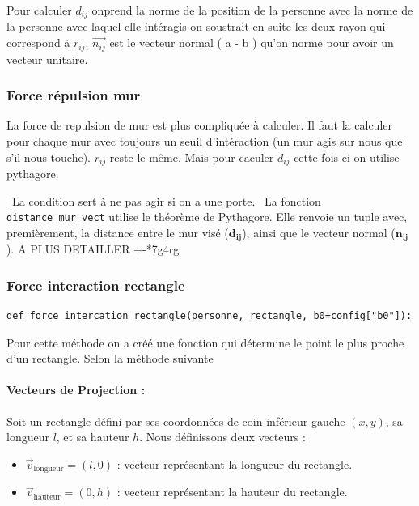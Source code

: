 \documentclass[a4paper,12pt]{article}
\begin{document}
Pour calculer $d_{ij}$ onprend la norme de la position de la personne avec la norme de la personne avec laquel elle intéragis on soustrait en suite les deux rayon qui correspond à $r_{ij}$. $\vec{n_{ij}}$ est le vecteur normal ( a - b ) qu'on norme pour avoir un vecteur unitaire. 


\subsubsection{Force répulsion mur}
La force de repulsion de mur est plus compliquée à calculer. Il faut la calculer pour chaque mur avec toujours un seuil d'intéraction (un mur agis sur nous que s'il nous touche). \textbf{$r_{ij}$} reste le même. Mais pour caculer \textbf{$d_{ij}$} cette fois ci on utilise pythagore.

\
La condition sert à ne pas agir si on a une porte.
\
La fonction \texttt{distance\_mur\_vect} utilise le théorème de Pythagore. Elle renvoie un tuple avec, premièrement, la distance entre le mur visé ($\mathbf{d_{ij}}$), ainsi que le vecteur normal ($\mathbf{n_{ij}}$). A PLUS DETAILLER +-*7g4rg


\subsubsection{Force interaction rectangle}

\begin{verbatim}
def force_intercation_rectangle(personne, rectangle, b0=config["b0"]):
\end{verbatim}

Pour cette méthode on a créé une fonction qui détermine le point le plus proche d'un rectangle. Selon la méthode suivante


\paragraph{Vecteurs de Projection :}

Soit un rectangle défini par ses coordonnées de coin inférieur gauche $(x, y)$, sa longueur $l$, et sa hauteur $h$. Nous définissons deux vecteurs :
\begin{itemize}
    \item $\vec{v}_{\text{longueur}} = (l, 0)$ : vecteur représentant la longueur du rectangle.
    \item $\vec{v}_{\text{hauteur}} = (0, h)$ : vecteur représentant la hauteur du rectangle.
\end{itemize}
\end{document}
